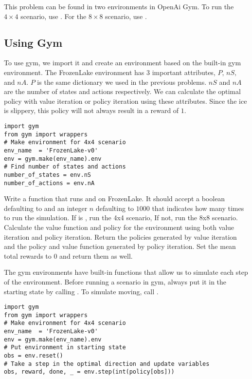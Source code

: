 This problem can be found in two environments in OpenAi Gym.
To run the $4\times 4$ scenario, use .
For the $8\times 8$ scenario, use .

\subsection*{Using Gym}
To use gym, we import it and create an environment based on the built-in gym environment.
The FrozenLake environment has $3$ important attributes, $P$, $nS,$ and $nA$.
$P$ is the same dictionary we used in the previous problems.
$nS$ and $nA$ are the number of states and actions respectively.
We can calculate the optimal policy with value iteration or policy iteration using these attributes.
Since the ice is slippery, this policy will not always result in a reward of $1$.

\begin{lstlisting}
import gym
from gym import wrappers
# Make environment for 4x4 scenario
env_name  = 'FrozenLake-v0'
env = gym.make(env_name).env
# Find number of states and actions
number_of_states = env.nS
number_of_actions = env.nA
\end{lstlisting}

\begin{problem}
\label{prob:policyiter-value5}
Write a function that runs  and  on FrozenLake.
It should accept a boolean  defaulting to  and an integer $n$ defaulting to $1000$ that indicates how many times to run the simulation.
If  is , run the 4x4 scenario,
If not, run the 8x8 scenario.
Calculate the value function and policy for the environment using both value iteration and policy iteration.
Return the policies generated by value iteration and the policy and value function generated by policy iteration.
Set the mean total rewards to $0$ and return them as well.
\end{problem}

The gym environments have built-in functions that allow us to simulate each step of the environment.
Before running a scenario in gym, always put it in the starting state by calling .
To simulate moving, call .

\begin{lstlisting}
import gym
from gym import wrappers
# Make environment for 4x4 scenario
env_name  = 'FrozenLake-v0'
env = gym.make(env_name).env
# Put environment in starting state
obs = env.reset()
# Take a step in the optimal direction and update variables
obs, reward, done, _ = env.step(int(policy[obs]))
\end{lstlisting}



